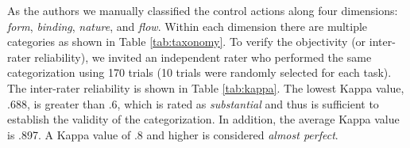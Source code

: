 \documentclass{sigchi}
\begin{document}
  As the authors we manually classified the control actions along four dimensions: \emph{form}, \emph{binding}, \emph{nature}, and \emph{flow}. Within each dimension there are multiple categories as shown in Table \ref{tab:taxonomy}. To verify the objectivity (or inter-rater reliability), we invited an independent rater who performed the same categorization using 170 trials (10 trials were randomly selected for each task). The inter-rater reliability is shown in Table \ref{tab:kappa}. The lowest Kappa value, .688, is greater than .6, which is rated as \textsl{substantial} and thus is sufficient to establish the validity of the categorization. In addition, the average Kappa value is .897. A Kappa value of .8 and higher is considered \textsl{almost perfect}\cite{kappavalue}.
\end{document}
